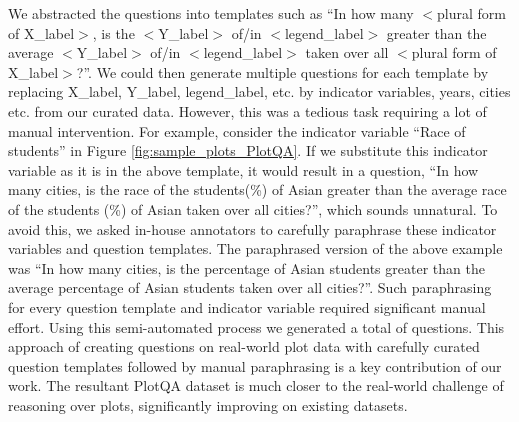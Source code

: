 \documentclass[10pt,twocolumn,letterpaper]{article}
\begin{document}

We abstracted the questions into templates such as ``In how many $<$plural form of X\_label$>$, is the $<$Y\_label$>$ of/in $<$legend\_label$>$ greater than the average $<$Y\_label$>$ of/in $<$legend\_label$>$ taken over all $<$plural form of X\_label$>$?''. We could then generate multiple questions for each template by replacing X\_label, Y\_label, legend\_label, etc. by indicator variables, years, cities etc. from our curated data. However, this was a tedious task requiring a lot of manual intervention. For example, consider the indicator variable ``Race of students'' in Figure \ref{fig:sample_plots_PlotQA}. 
If we substitute this indicator variable as it is in the above template, it would result in a question, ``In how many cities, is the race of the students(\%) of Asian greater than the average race of the students (\%) of Asian taken over all cities?'', which sounds unnatural. To avoid this, we asked in-house annotators to carefully paraphrase these indicator variables and question templates. %
The paraphrased version of the above example was ``In how many cities, is the percentage of Asian students greater than the average percentage of Asian students taken over all cities?''. Such paraphrasing for every question template and indicator variable required significant manual effort. Using this semi-automated process we generated a total of  questions. %
This approach of creating questions on real-world plot data with carefully curated question templates followed by manual paraphrasing is a key contribution of our work. 
The resultant PlotQA dataset is much closer to the real-world challenge of reasoning over plots, significantly improving on existing datasets.
\end{document}
